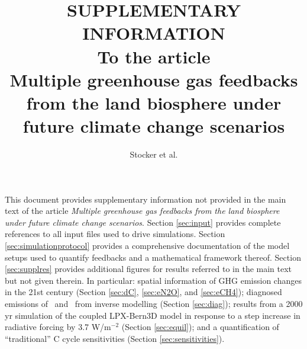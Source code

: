 \documentclass{myreport}
\begin{document}
\pagestyle{headings}

% 

\title{SUPPLEMENTARY INFORMATION\\ \vskip 3mm {\large To the article}\\{\Large \sf Multiple greenhouse gas feedbacks from the land biosphere under future climate change scenarios}}
\author{Stocker et al.} 

\maketitle



This document provides supplementary information not provided in the main text of the article {\it Multiple greenhouse gas feedbacks from the land biosphere under future climate change scenarios}. Section \ref{sec:input} provides complete references to all input files used to drive simulations. Section \ref{sec:simulationprotocol} provides a comprehensive documentation of the model setups used to quantify feedbacks and a mathematical framework thereof. Section \ref{sec:supplres} provides additional figures for results referred to in the main text but not given therein. In particular: spatial information of GHG emission changes in the 21st century (Section \ref{sec:dC}, \ref{sec:eN2O}, and \ref{sec:eCH4}); diagnosed emissions of \nno\ and \chh\ from inverse modelling (Section \ref{sec:diag}); results from a 2000 yr simulation of the coupled LPX-Bern3D model in response to a step increase in radiative forcing by 3.7 W/m$^{-2}$ (Section \ref{sec:equil}); and a quantification of ``traditional'' C cycle sensitivities (Section \ref{sec:sensitivities}).

\clearpage


\end{document}

